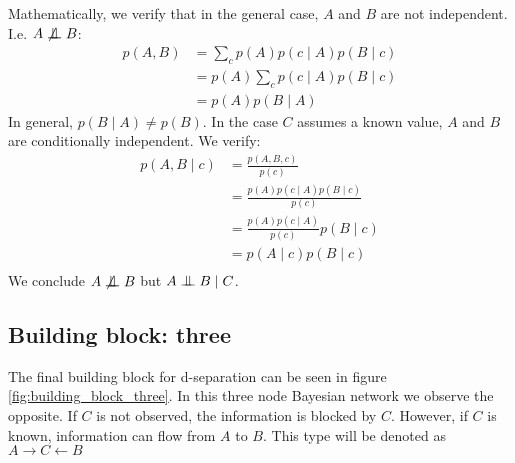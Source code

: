 \noindent
Mathematically, we verify that in the general case, $A$ and $B$ are
not independent. I.e. $A \not \CI B$:
\begin{equation}\begin{split}
p(A, B) 
	&= \sum_c p(A)p(c \mid A)p(B \mid c) \\
	&= p(A) \sum_c p(c \mid A)p(B \mid c) \\
	&= p(A) p(B \mid A)
\end{split}\end{equation}
In general, $p(B \mid A) \neq p(B)$. In the case $C$ assumes a known
value, $A$ and $B$ are conditionally independent. We verify:
\begin{equation}\begin{split}
p(A, B \mid c) 
	&= \frac{p(A, B, c)}{p(c)}\\
	&= \frac{p(A)p(c \mid A)p(B \mid c)}{p(c)} \\
	&= \frac{p(A)p(c \mid A)}{p(c)} p(B \mid c)\\
	&= p(A \mid c)p(B \mid c)\\
\end{split}\end{equation}
We conclude $A \not \CI B$ but $A \CI B \mid C$.

\subsection{Building block: three}
The final building block for d-separation can be seen in figure
\ref{fig:building_block_three}. In this three node Bayesian network
we observe the opposite. If $C$ is not observed, the information
is blocked by $C$. However, if $C$ is known, information can flow
from $A$ to $B$. This type will be denoted as $A \rightarrow C
\leftarrow B$

